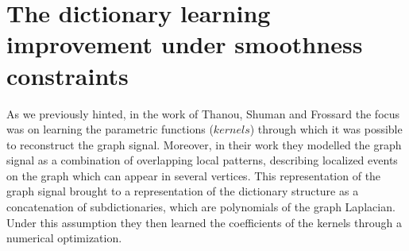 \chapter{The dictionary learning improvement under smoothness constraints}
\label{sec:DL}
As we previously hinted, in the work of Thanou, Shuman and Frossard the focus was on learning the parametric functions ($kernels$) through which it was possible to reconstruct the graph signal. Moreover, in their work they modelled the graph signal as a combination of overlapping local patterns, describing localized events on the graph which can appear in several vertices. This representation of the graph signal brought to a representation of the dictionary structure as a concatenation of subdictionaries, which are polynomials of the graph Laplacian. Under this assumption they then learned the coefficients of the kernels through a numerical optimization.

